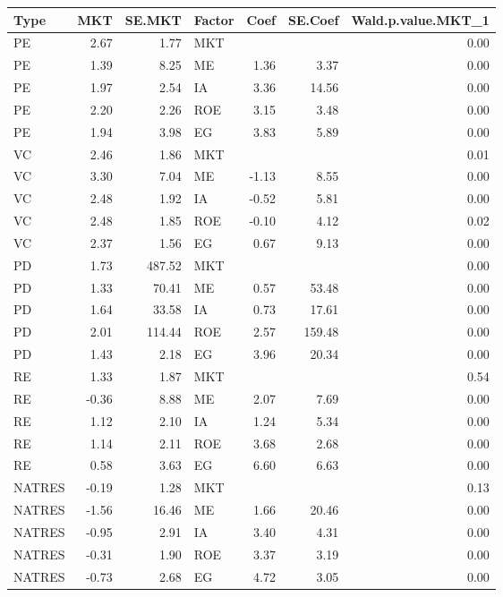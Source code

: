 \documentclass[12pt]{article}
\begin{document}
\begin{table}[ht]
	\centering
	\begin{tabular}{lrrlrrr}
		Type & MKT & SE.MKT & Factor & Coef & SE.Coef & Wald.p.value.MKT\_1 \\ 
		\hline
		\hline
		PE & 2.67 & 1.77 & MKT &  &  & 0.00 \\ 
		PE & 1.39 & 8.25 & ME & 1.36 & 3.37 & 0.00 \\ 
		PE & 1.97 & 2.54 & IA & 3.36 & 14.56 & 0.00 \\ 
		PE & 2.20 & 2.26 & ROE & 3.15 & 3.48 & 0.00 \\ 
		PE & 1.94 & 3.98 & EG & 3.83 & 5.89 & 0.00 \\ 
		\hline
		VC & 2.46 & 1.86 & MKT &  &  & 0.01 \\ 
		VC & 3.30 & 7.04 & ME & -1.13 & 8.55 & 0.00 \\ 
		VC & 2.48 & 1.92 & IA & -0.52 & 5.81 & 0.00 \\ 
		VC & 2.48 & 1.85 & ROE & -0.10 & 4.12 & 0.02 \\ 
		VC & 2.37 & 1.56 & EG & 0.67 & 9.13 & 0.00 \\ 
		\hline
		PD & 1.73 & 487.52 & MKT &  &  & 0.00 \\ 
		PD & 1.33 & 70.41 & ME & 0.57 & 53.48 & 0.00 \\ 
		PD & 1.64 & 33.58 & IA & 0.73 & 17.61 & 0.00 \\ 
		PD & 2.01 & 114.44 & ROE & 2.57 & 159.48 & 0.00 \\ 
		PD & 1.43 & 2.18 & EG & 3.96 & 20.34 & 0.00 \\ 
		\hline
		RE & 1.33 & 1.87 & MKT &  &  & 0.54 \\ 
		RE & -0.36 & 8.88 & ME & 2.07 & 7.69 & 0.00 \\ 
		RE & 1.12 & 2.10 & IA & 1.24 & 5.34 & 0.00 \\ 
		RE & 1.14 & 2.11 & ROE & 3.68 & 2.68 & 0.00 \\ 
		RE & 0.58 & 3.63 & EG & 6.60 & 6.63 & 0.00 \\ 
		\hline
		NATRES & -0.19 & 1.28 & MKT &  &  & 0.13 \\ 
		NATRES & -1.56 & 16.46 & ME & 1.66 & 20.46 & 0.00 \\ 
		NATRES & -0.95 & 2.91 & IA & 3.40 & 4.31 & 0.00 \\ 
		NATRES & -0.31 & 1.90 & ROE & 3.37 & 3.19 & 0.00 \\ 
		NATRES & -0.73 & 2.68 & EG & 4.72 & 3.05 & 0.00 \\ 

\end{tabular}
\end{table}
\end{document}
